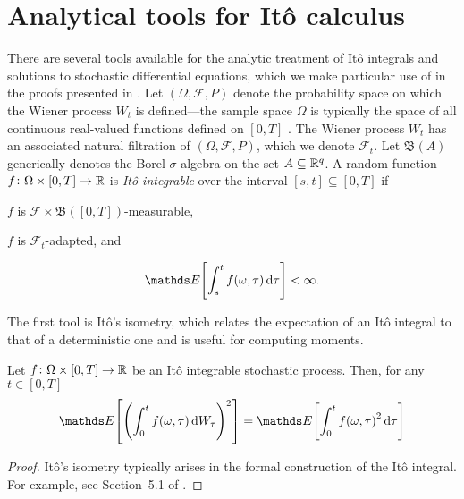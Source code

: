 \section{Analytical tools for It\^o calculus}\label{app:ito_tools}
There are several tools available for the analytic treatment of It\^o integrals and solutions to stochastic differential equations, which we make particular use of in the proofs presented in .
Let \(\left(\Omega, \mathcal{F}, P\right)\) denote the probability space on which the Wiener process \(W_t\) is defined---the sample space \(\Omega\) is typically the space of all continuous real-valued functions defined on \([0,T]\) \citep{KallianpurSundar_2014_StochasticAnalysisDiffusion}.
The Wiener process \(W_t\) has an associated natural filtration of \(\left(\Omega, \mathcal{F}, P\right)\), which we denote \(\mathcal{F}_t\).
Let \(\mathfrak{B}\!\left(A\right)\) generically denotes the Borel \(\sigma\)-algebra on the set \(A \subseteq \mathbb{R}^q\).
A random function \(f\colon \Omega \times [0,T] \to \mathbb{R}\) is \emph{It\^o integrable} over the interval \([s,t] \subseteq [0,T]\) if \citep{Oksendal_2003_StochasticDifferentialEquations,KallianpurSundar_2014_StochasticAnalysisDiffusion}
\begin{romanate}
	\item \(f\) is \(\mathcal{F} \times \mathfrak{B}\!\left([0,T]\right)\)-measurable,
	\item \(f\) is \(\mathcal{F}_t\)-adapted, and
	\item \[
		\avg{\int_s^t{f\!\left(\omega, \tau\right)\dif\tau}} < \infty.
	\]
\end{romanate}

The first tool is It\^o's isometry, which relates the expectation of an It\^o integral to that of a deterministic one and is useful for computing moments.

\begin{theorem}[It\^o's Isometry]\label{thm:ito_isom}
	Let \(f\colon \Omega \times [0,T] \to \mathbb{R}\) be an It\^o integrable stochastic process.
	Then, for any \(t \in [0,T]\)
	\[
		\avg{\left(\int_0^t{f\!\left(\omega, \tau\right)\dif W_\tau}\right)^2} = \avg{\int_0^t{f\!\left(\omega, \tau\right)^2\dif\tau}}
	\]
\end{theorem}

\begin{proof}
	It\^o's isometry typically arises in the formal construction of the It\^o integral.
	For example, see Section~5.1 of \citet{KallianpurSundar_2014_StochasticAnalysisDiffusion}.
\end{proof}

